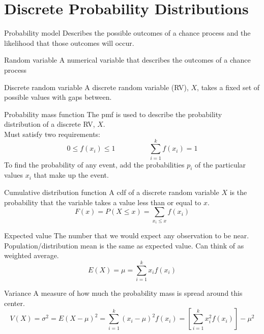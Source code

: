 \documentclass[]{article}
\newenvironment{definitions}{
	\begin{description}[font=\sffamily\bfseries, leftmargin=1cm, style=nextline]
	}{
	\end{description}
}
\begin{document}
\section{Discrete Probability Distributions}
\begin{definitions}
	\item[Probability model]
	Describes the possible outcomes of a chance process and the likelihood that those outcomes will occur.
	\item[Random variable]
	A numerical variable that describes the outcomes of a chance process
	\item[Discrete random variable]
	A discrete random variable (RV), $X$, takes a fixed set of possible values with gaps between.
	\item[Probability mass function]
	The pmf is used to describe the probability distribution of a discrete RV, $X$.\\
	Must satisfy two requirements:
	\[
		0 \leq f(x_i) \leq 1 \hspace{2cm} \sum_{i=1}^{k}f(x_i) = 1
	\]
	To find the probability of any event, add the probabilities $p_i$ of the particular values $x_i$ that make up the event.
	\item[Cumulative distribution function]
	A cdf of a discrete random variable $X$ is the probability that the variable takes a value less than or equal to $x$.
	\[ F(x) = P(X \leq x) = {\sum}_{x_i \leq x}f(x_i) \]
	\item[Expected value]
	The number that we would expect any observation to be near. Population/distribution mean is the same as expected value. Can think of as weighted average.
	\[ E(X) = \mu = \sum_{i=1}^{k}x_if(x_i) \]
	\item[Variance]
	A measure of how much the probability mass is spread around this center.
	\[ V(X) = \sigma^2 = E(X - \mu)^2 = \sum_{i=1}^{k}(x_i-\mu)^2f(x_i) = \left[\sum_{i=1}^{k}x_i^2f(x_i)\right]-\mu^2 \]
\end{definitions}
\end{document}
